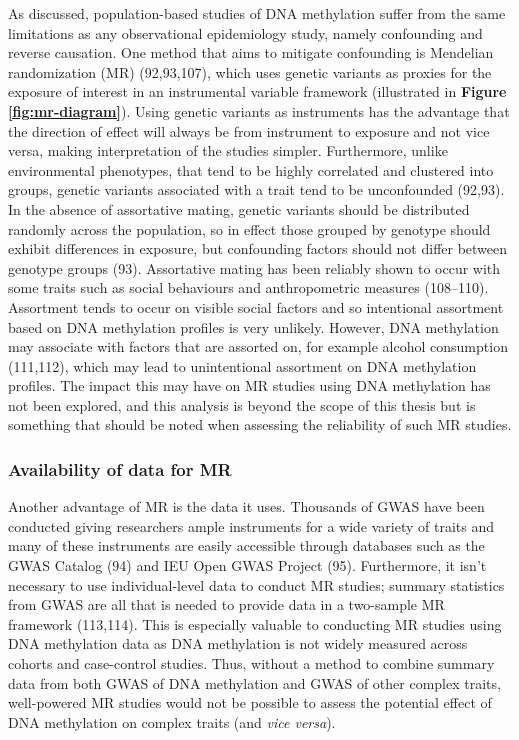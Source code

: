 \documentclass[11pt,oneside]{bristolthesis}
\begin{document}
As discussed, population-based studies of DNA methylation suffer from the same limitations as any observational epidemiology study, namely confounding and reverse causation. One method that aims to mitigate confounding is Mendelian randomization (MR) (92,93,107), which uses genetic variants as proxies for the exposure of interest in an instrumental variable framework (illustrated in \textbf{Figure \ref{fig:mr-diagram}}). Using genetic variants as instruments has the advantage that the direction of effect will always be from instrument to exposure and not vice versa, making interpretation of the studies simpler. Furthermore, unlike environmental phenotypes, that tend to be highly correlated and clustered into groups, genetic variants associated with a trait tend to be unconfounded (92,93). In the absence of assortative mating, genetic variants should be distributed randomly across the population, so in effect those grouped by genotype should exhibit differences in exposure, but confounding factors should not differ between genotype groups (93). Assortative mating has been reliably shown to occur with some traits such as social behaviours and anthropometric measures (108--110). Assortment tends to occur on visible social factors and so intentional assortment based on DNA methylation profiles is very unlikely. However, DNA methylation may associate with factors that are assorted on, for example alcohol consumption (111,112), which may lead to unintentional assortment on DNA methylation profiles. The impact this may have on MR studies using DNA methylation has not been explored, and this analysis is beyond the scope of this thesis but is something that should be noted when assessing the reliability of such MR studies.

\hypertarget{availability-of-data-for-mr}{%
\subsubsection{Availability of data for MR}\label{availability-of-data-for-mr}}

Another advantage of MR is the data it uses. Thousands of GWAS have been conducted giving researchers ample instruments for a wide variety of traits and many of these instruments are easily accessible through databases such as the GWAS Catalog (94) and IEU Open GWAS Project (95). Furthermore, it isn't necessary to use individual-level data to conduct MR studies; summary statistics from GWAS are all that is needed to provide data in a two-sample MR framework (113,114). This is especially valuable to conducting MR studies using DNA methylation data as DNA methylation is not widely measured across cohorts and case-control studies. Thus, without a method to combine summary data from both GWAS of DNA methylation and GWAS of other complex traits, well-powered MR studies would not be possible to assess the potential effect of DNA methylation on complex traits (and \emph{vice versa}).
\end{document}
